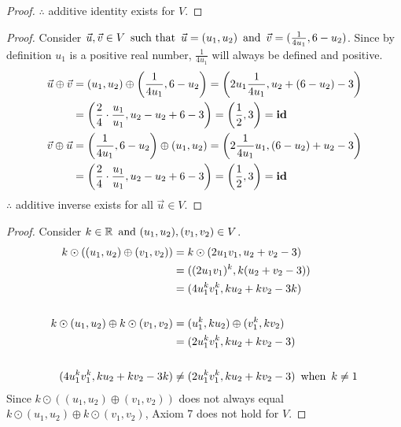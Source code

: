 \begin{enumerate}
\begin{proof}
    $\therefore$ additive identity exists for $V$.
  \end{proof}
  \begin{proof}
    Consider $\vec{u}, \vec{v} \in V \operatorname{~\text{such that}~} \vec{u} = (u_1, u_2) \operatorname{~\text{and}~} \vec{v} = (\frac{1}{4u_1},6-u_2)$. Since by definition $u_1$ is a positive real number, $\frac{1}{4u_1}$ will always be defined and positive.
    \begin{align*}
      \vec{u} \oplus \vec{v} & = (u_1, u_2) \oplus \left(\frac{1}{4u_1}, 6-u_2\right) = \left(2u_1\frac{1}{4u_1}, u_2 + (6 - u_2) - 3\right) \\
                             & = \left(\frac{2}{4}\cdot\frac{u_1}{u_1}, u_2 - u_2 + 6 - 3\right) = \left(\frac{1}{2}, 3\right) = \operatorname{\textbf{id}}         \\
      \vec{v} \oplus \vec{u} & = \left(\frac{1}{4u_1}, 6-u_2\right) \oplus (u_1, u_2) = \left(2\frac{1}{4u_1}u_1, (6 - u_2) + u_2 - 3\right) \\
                             & = \left(\frac{2}{4}\cdot\frac{u_1}{u_1}, u_2 - u_2 + 6 - 3\right) = \left(\frac{1}{2}, 3\right) = \operatorname{\textbf{id}}
    \end{align*}
    $\therefore$ additive inverse exists for all $\vec{u} \in V$.
  \end{proof}
  \begin{proof}
    Consider $k \in \mathbb{R} \operatorname{~\text{and}~} (u_1,u_2), (v_1,v_2) \in V$.
    \begin{align*}
      k \odot ((u_1,u_2) \oplus (v_1, v_2))       & = k \odot (2u_1v_1, u_2+v_2-3)                 \\
                                                  & = ((2u_1v_1)^k,k(u_2+v_2-3))                   \\
                                                  & = (4u_1^kv_1^k,ku_2+kv_2-3k)                   \\ \\
      k \odot (u_1,u_2) \oplus k \odot (v_1, v_2) & = (u_1^k,ku_2) \oplus (v_1^k,kv_2)             \\
                                                  & = (2u_1^kv_1^k,ku_2+kv_2-3)                    \\ \\
      (4u_1^kv_1^k,ku_2+kv_2-3k)                  & \neq (2u_1^kv_1^k,ku_2+kv_2-3) \operatorname{~\text{when}~} k \neq 1
    \end{align*}
    Since $k \odot ((u_1,u_2) \oplus (v_1, v_2))$ does not always equal $k \odot (u_1,u_2) \oplus k \odot (v_1, v_2)$, Axiom 7 does not hold for $V$.
  \end{proof}
\end{enumerate}
\newpage

